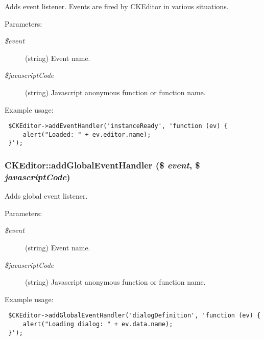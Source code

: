 Adds event listener. Events are fired by CKEditor in various situations.

\begin{Desc}
\item[Parameters:]
\begin{description}
\item[{\em \$event}](string) Event name. \item[{\em \$javascriptCode}](string) Javascript anonymous function or function name.\end{description}
\end{Desc}
Example usage: 

\begin{Code}\begin{verbatim} $CKEditor->addEventHandler('instanceReady', 'function (ev) {
     alert("Loaded: " + ev.editor.name);
 }');
\end{verbatim}
\end{Code}

 \hypertarget{classCKEditor_3bc88e349a30e84ddbdee5d55950ddb1}{
\subsubsection[{addGlobalEventHandler}]{\setlength{\rightskip}{0pt plus 5cm}CKEditor::addGlobalEventHandler (\$ {\em event}, \/  \$ {\em javascriptCode})}}
\label{classCKEditor_3bc88e349a30e84ddbdee5d55950ddb1}


Adds global event listener.

\begin{Desc}
\item[Parameters:]
\begin{description}
\item[{\em \$event}](string) Event name. \item[{\em \$javascriptCode}](string) Javascript anonymous function or function name.\end{description}
\end{Desc}
Example usage: 

\begin{Code}\begin{verbatim} $CKEditor->addGlobalEventHandler('dialogDefinition', 'function (ev) {
     alert("Loading dialog: " + ev.data.name);
 }');
\end{verbatim}
\end{Code}

